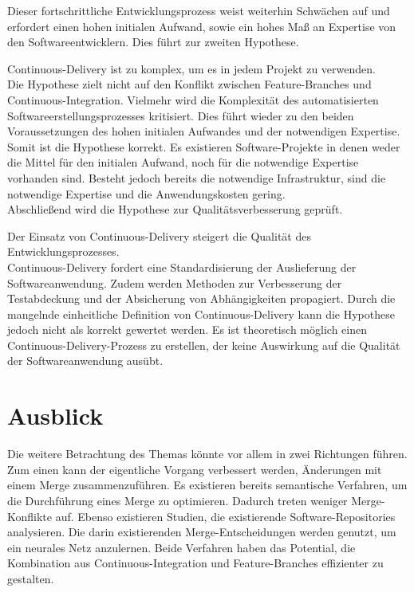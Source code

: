Dieser fortschrittliche Entwicklungsprozess weist weiterhin Schwächen auf und erfordert einen hohen initialen Aufwand, sowie ein hohes Maß an Expertise von den Softwareentwicklern. Dies führt zur zweiten Hypothese. 

\glqq Continuous-Delivery ist zu komplex, um es in jedem Projekt zu verwenden.\grqq{}
\\
Die Hypothese zielt nicht auf den Konflikt zwischen Feature-Branches und Continuous-Integration. Vielmehr wird die Komplexität des automatisierten Softwareerstellungsprozesses kritisiert. Dies führt wieder zu den beiden Voraussetzungen des hohen initialen Aufwandes und der notwendigen Expertise. Somit ist die Hypothese korrekt. Es existieren Software-Projekte in denen weder die Mittel für den initialen Aufwand, noch für die notwendige Expertise vorhanden sind. Besteht jedoch bereits die notwendige Infrastruktur, sind die notwendige Expertise und die Anwendungskosten gering. 
\\
Abschließend wird die Hypothese zur Qualitätsverbesserung geprüft.

\glqq Der Einsatz von Continuous-Delivery steigert die Qualität des Entwicklungsprozesses.\grqq{}
\\
Continuous-Delivery fordert eine Standardisierung der Auslieferung der Softwareanwendung. Zudem werden Methoden zur Verbesserung der Testabdeckung und der Absicherung von Abhängigkeiten propagiert. Durch die mangelnde einheitliche Definition von Continuous-Delivery kann die Hypothese jedoch nicht als korrekt gewertet werden. Es ist theoretisch möglich einen Continuous-Delivery-Prozess zu erstellen, der keine Auswirkung auf die Qualität der Softwareanwendung ausübt.

\section{Ausblick}

Die weitere Betrachtung des Themas könnte vor allem in zwei Richtungen führen. Zum einen kann der eigentliche Vorgang verbessert werden, Änderungen mit einem Merge zusammenzuführen. Es existieren bereits semantische Verfahren, um die Durchführung eines Merge zu optimieren. Dadurch treten weniger Merge-Konflikte auf. Ebenso existieren Studien, die existierende Software-Repositories analysieren. Die darin existierenden Merge-Entscheidungen werden genutzt, um ein neurales Netz anzulernen. Beide Verfahren haben das Potential, die Kombination aus Continuous-Integration und Feature-Branches effizienter zu gestalten.

